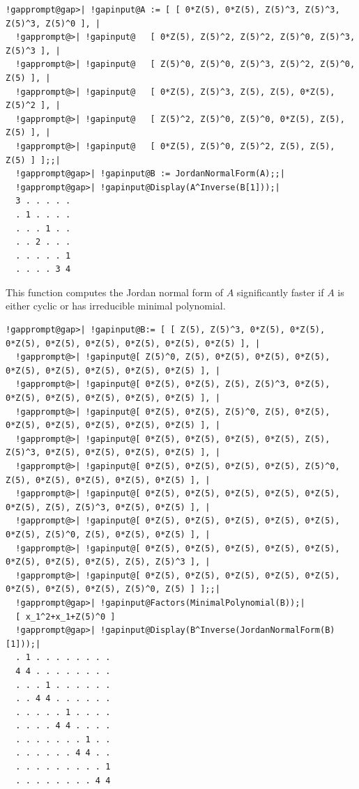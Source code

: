 \documentclass[a4paper,11pt]{report}
\begin{document}
{{{ 
\begin{Verbatim}[commandchars=!@|,fontsize=\small,frame=single,label=Example]
  !gapprompt@gap>| !gapinput@A := [ [ 0*Z(5), 0*Z(5), Z(5)^3, Z(5)^3, Z(5)^3, Z(5)^0 ], |
  !gapprompt@>| !gapinput@   [ 0*Z(5), Z(5)^2, Z(5)^2, Z(5)^0, Z(5)^3, Z(5)^3 ], |
  !gapprompt@>| !gapinput@   [ Z(5)^0, Z(5)^0, Z(5)^3, Z(5)^2, Z(5)^0, Z(5) ], |
  !gapprompt@>| !gapinput@   [ 0*Z(5), Z(5)^3, Z(5), Z(5), 0*Z(5), Z(5)^2 ], |
  !gapprompt@>| !gapinput@   [ Z(5)^2, Z(5)^0, Z(5)^0, 0*Z(5), Z(5), Z(5) ], |
  !gapprompt@>| !gapinput@   [ 0*Z(5), Z(5)^0, Z(5)^2, Z(5), Z(5), Z(5) ] ];;|
  !gapprompt@gap>| !gapinput@B := JordanNormalForm(A);;|
  !gapprompt@gap>| !gapinput@Display(A^Inverse(B[1]));|
  3 . . . . .
  . 1 . . . .
  . . . 1 . .
  . . 2 . . .
  . . . . . 1
  . . . . 3 4
\end{Verbatim}
 This function computes the Jordan normal form of $A$ significantly faster if $A$ is either cyclic or has irreducible minimal polynomial. 
\begin{Verbatim}[commandchars=!@|,fontsize=\small,frame=single,label=Example]
  !gapprompt@gap>| !gapinput@B:= [ [ Z(5), Z(5)^3, 0*Z(5), 0*Z(5), 0*Z(5), 0*Z(5), 0*Z(5), 0*Z(5), 0*Z(5), 0*Z(5) ], |
  !gapprompt@>| !gapinput@[ Z(5)^0, Z(5), 0*Z(5), 0*Z(5), 0*Z(5), 0*Z(5), 0*Z(5), 0*Z(5), 0*Z(5), 0*Z(5) ], |
  !gapprompt@>| !gapinput@[ 0*Z(5), 0*Z(5), Z(5), Z(5)^3, 0*Z(5), 0*Z(5), 0*Z(5), 0*Z(5), 0*Z(5), 0*Z(5) ], |
  !gapprompt@>| !gapinput@[ 0*Z(5), 0*Z(5), Z(5)^0, Z(5), 0*Z(5), 0*Z(5), 0*Z(5), 0*Z(5), 0*Z(5), 0*Z(5) ], |
  !gapprompt@>| !gapinput@[ 0*Z(5), 0*Z(5), 0*Z(5), 0*Z(5), Z(5), Z(5)^3, 0*Z(5), 0*Z(5), 0*Z(5), 0*Z(5) ], |
  !gapprompt@>| !gapinput@[ 0*Z(5), 0*Z(5), 0*Z(5), 0*Z(5), Z(5)^0, Z(5), 0*Z(5), 0*Z(5), 0*Z(5), 0*Z(5) ], |
  !gapprompt@>| !gapinput@[ 0*Z(5), 0*Z(5), 0*Z(5), 0*Z(5), 0*Z(5), 0*Z(5), Z(5), Z(5)^3, 0*Z(5), 0*Z(5) ], |
  !gapprompt@>| !gapinput@[ 0*Z(5), 0*Z(5), 0*Z(5), 0*Z(5), 0*Z(5), 0*Z(5), Z(5)^0, Z(5), 0*Z(5), 0*Z(5) ], |
  !gapprompt@>| !gapinput@[ 0*Z(5), 0*Z(5), 0*Z(5), 0*Z(5), 0*Z(5), 0*Z(5), 0*Z(5), 0*Z(5), Z(5), Z(5)^3 ], |
  !gapprompt@>| !gapinput@[ 0*Z(5), 0*Z(5), 0*Z(5), 0*Z(5), 0*Z(5), 0*Z(5), 0*Z(5), 0*Z(5), Z(5)^0, Z(5) ] ];;|
  !gapprompt@gap>| !gapinput@Factors(MinimalPolynomial(B));|
  [ x_1^2+x_1+Z(5)^0 ]
  !gapprompt@gap>| !gapinput@Display(B^Inverse(JordanNormalForm(B)[1]));|
  . 1 . . . . . . . .
  4 4 . . . . . . . .
  . . . 1 . . . . . .
  . . 4 4 . . . . . .
  . . . . . 1 . . . .
  . . . . 4 4 . . . .
  . . . . . . . 1 . .
  . . . . . . 4 4 . .
  . . . . . . . . . 1
  . . . . . . . . 4 4
\end{Verbatim}
 }

 }

 }
\end{document}
